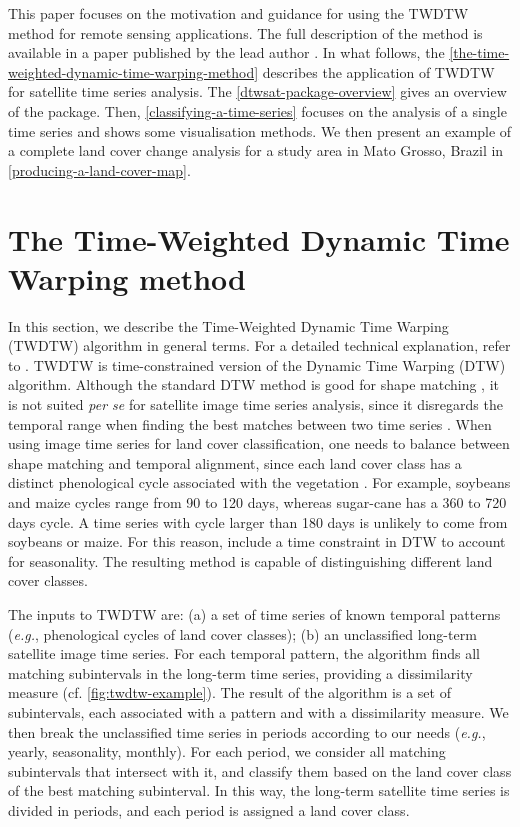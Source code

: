 \documentclass[article,shortnames]{jss}
\begin{document}
This paper focuses on the motivation and guidance for using the TWDTW
method for remote sensing applications. The full description of the
method is available in a paper published by the lead author
\citep{Maus:2016}. In what follows, the
\autoref{the-time-weighted-dynamic-time-warping-method} describes the
application of TWDTW \citep{Maus:2016} for satellite time series
analysis. The \autoref{dtwsat-package-overview} gives an overview of the
 package. Then, \autoref{classifying-a-time-series} focuses
on the analysis of a single time series and shows some visualisation
methods. We then present an example of a complete land cover change
analysis for a study area in Mato Grosso, Brazil in
\autoref{producing-a-land-cover-map}.

\section{The Time-Weighted Dynamic Time Warping
method}\label{the-time-weighted-dynamic-time-warping-method}

In this section, we describe the Time-Weighted Dynamic Time Warping
(TWDTW) algorithm in general terms. For a detailed technical
explanation, refer to \citet{Maus:2016}. TWDTW is time-constrained
version of the Dynamic Time Warping (DTW) algorithm. Although the
standard DTW method is good for shape matching \citep{Keogh:2005}, it is
not suited \emph{per se} for satellite image time series analysis, since
it disregards the temporal range when finding the best matches between
two time series \citep{Maus:2016}. When using image time series for land
cover classification, one needs to balance between shape matching and
temporal alignment, since each land cover class has a distinct
phenological cycle associated with the vegetation
\citep[\citet{Zhang:2003}]{Reed:1994}. For example, soybeans and maize
cycles range from 90 to 120 days, whereas sugar-cane has a 360 to 720
days cycle. A time series with cycle larger than 180 days is unlikely to
come from soybeans or maize. For this reason, \citet{Maus:2016} include
a time constraint in DTW to account for seasonality. The resulting
method is capable of distinguishing different land cover classes.

The inputs to TWDTW are: (a) a set of time series of known temporal
patterns (\emph{e.g.}, phenological cycles of land cover classes); (b)
an unclassified long-term satellite image time series. For each temporal
pattern, the algorithm finds all matching subintervals in the long-term
time series, providing a dissimilarity measure (cf.
\autoref{fig:twdtw-example}). The result of the algorithm is a set of
subintervals, each associated with a pattern and with a dissimilarity
measure. We then break the unclassified time series in periods according
to our needs (\emph{e.g.}, yearly, seasonality, monthly). For each
period, we consider all matching subintervals that intersect with it,
and classify them based on the land cover class of the best matching
subinterval. In this way, the long-term satellite time series is divided
in periods, and each period is assigned a land cover class.
\end{document}
